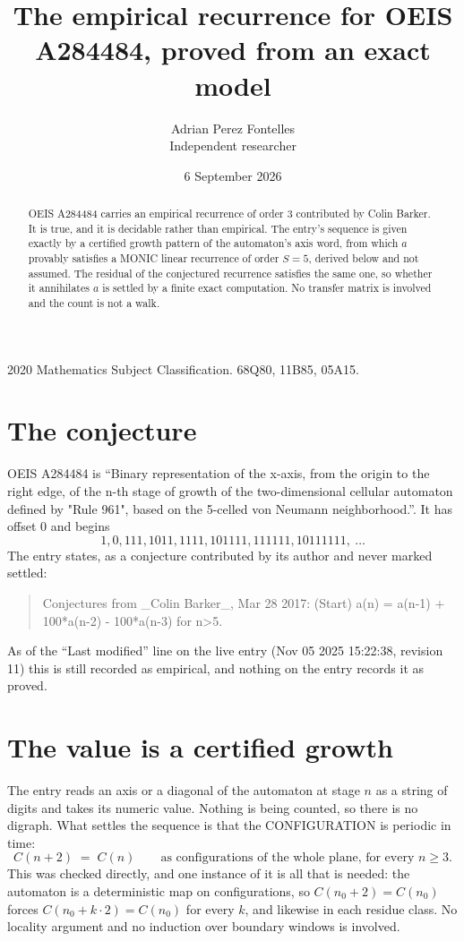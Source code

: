 \documentclass[11pt,a4paper]{article}
\title{The empirical recurrence for OEIS A284484, proved from an exact model}
\author{Adrian Perez Fontelles\\ \small Independent researcher}
\date{6 September 2026}
\theoremstyle{plain}
\theoremstyle{definition}
\begin{document}
\maketitle

\begin{abstract}
OEIS A284484 carries an empirical recurrence of order $3$ contributed by Colin Barker. It is true, and it is
decidable rather than empirical. The entry's sequence is given exactly by a certified growth pattern of the automaton's axis word, from
which $a$ provably satisfies a MONIC linear recurrence of order $S=5$, derived below and not
assumed. The residual of the conjectured recurrence satisfies the same one, so whether it
annihilates $a$ is settled by a finite exact computation. No transfer matrix is involved and
the count is not a walk.
\end{abstract}

\noindent\small 2020 Mathematics Subject Classification. 68Q80, 11B85, 05A15.\normalsize

\section{The conjecture}

OEIS A284484 is ``Binary representation of the x-axis, from the origin to the right edge, of the n-th stage of growth of the two-dimensional cellular automaton defined by "Rule 961", based on the 5-celled von Neumann neighborhood.''. It has offset $0$ and begins
\[
1, 0, 111, 1011, 1111, 101111, 111111, 10111111,\ \dots
\]
The entry states, as a conjecture contributed by its author and never marked settled:
\begin{quote}
Conjectures from \_Colin Barker\_, Mar 28 2017: (Start) a(n) = a(n-1) + 100*a(n-2) - 100*a(n-3) for n>5.
\end{quote}
As of the ``Last modified'' line on the live entry (Nov 05 2025 15:22:38, revision 11)
this is still recorded as empirical, and nothing on the entry records it as proved.

\section{The value is a certified growth}

The entry reads an axis or a diagonal of the automaton at stage $n$ as a string of digits and
takes its numeric value. Nothing is being counted, so there is no digraph. What settles the
sequence is that the CONFIGURATION is periodic in time:
\[
C(n+2)\;=\;C(n)\qquad\text{as configurations of the whole plane, for every } n\ge 3.
\]
This was checked directly, and one instance of it is all that is needed: the automaton is a
deterministic map on configurations, so $C(n_0+2)=C(n_0)$ forces $C(n_0+k\cdot2)=C(n_0)$ for
every $k$, and likewise in each residue class. No locality argument and no induction over
boundary windows is involved.
\end{document}
